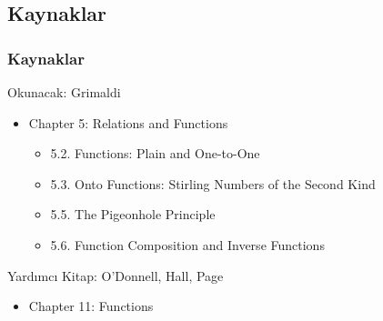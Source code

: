 \documentclass[dvipsnames]{beamer}
\theoremstyle{definition}
\theoremstyle{example}
\theoremstyle{plain}
\begin{document}
\subsection*{Kaynaklar}

\begin{frame}
  \frametitle{Kaynaklar}

  \begin{block}{Okunacak: Grimaldi}
    \begin{itemize}
      \item Chapter 5: Relations and Functions
      \begin{itemize}
        \item 5.2. \alert{Functions: Plain and One-to-One}
        \item 5.3. \alert{Onto Functions: Stirling Numbers of the Second Kind}
        \item 5.5. \alert{The Pigeonhole Principle}
        \item 5.6. \alert{Function Composition and Inverse Functions}
      \end{itemize}
    \end{itemize}
  \end{block}

  \begin{block}{Yardımcı Kitap: O'Donnell, Hall, Page}
    \begin{itemize}
      \item Chapter 11: Functions
    \end{itemize}
  \end{block}
\end{frame}
\end{document}
